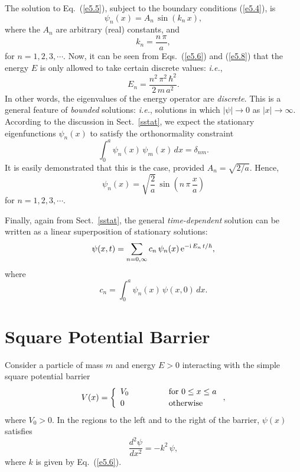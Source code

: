 The solution to Eq.~(\ref{e5.5}), subject to the boundary conditions
(\ref{e5.4}), is
\begin{equation}
\psi_n(x) = A_n\,\sin(k_n\,x),
\end{equation}
where the $A_n$ are arbitrary (real) constants, and
\begin{equation}\label{e5.8}
k_n = \frac{n\,\pi}{a},
\end{equation}
for $n=1,2,3,\cdots$. Now, it can be seen from Eqs.~(\ref{e5.6}) and (\ref{e5.8}) 
that the energy $E$ is only allowed to take certain discrete values:
{\em i.e.},
\begin{equation}\label{eenergy}
E_n = \frac{n^2\,\pi^2\,\hbar^2}{2\,m\,a^2}.
\end{equation}
In other words, the eigenvalues of the energy operator are {\em discrete}. This
is a general feature of {\em bounded}\/ solutions: {\em i.e.}, solutions in which $|\psi|\rightarrow 0$ as $|x|\rightarrow\infty$. According to the discussion in Sect.~\ref{sstat},
we expect the stationary eigenfunctions $\psi_n(x)$ to satisfy
the orthonormality constraint
\begin{equation}
\int_0^a \psi_n(x)\,\psi_m(x)\,dx = \delta_{nm}.
\end{equation}
It is easily demonstrated that this is the case, provided $A_n = \sqrt{2/a}$. 
Hence,
\begin{equation}\label{e5.11}
\psi_n(x) = \sqrt{\frac{2}{a}}\,\sin\left(n\,\pi\,\frac{x}{a}\right)
\end{equation}
for $n=1,2,3,\cdots$. 

Finally, again from Sect.~\ref{sstat}, the general {\em time-dependent}\/ solution can be written as a linear superposition of stationary solutions:
\begin{equation}
\psi(x,t) = \sum_{n=0,\infty} c_n\,\psi_n(x)\,{\rm e}^{-{\rm i}\,E_n\,t/\hbar},
\end{equation}
where
\begin{equation}\label{e5.13}
c_n = \int_0^a\psi_n(x)\,\psi(x,0)\,dx.
\end{equation}

\section{Square Potential Barrier}\label{s5.3}
Consider a particle of mass $m$ and energy $E>0$ interacting with the
simple square potential barrier
\begin{equation}
V(x) = \left\{\begin{array}{lcl}
V_0&\mbox{\hspace{1cm}}&\mbox{for $0\leq x\leq a$}\\[0.5ex]
0&&\mbox{otherwise}
\end{array}
\right.,
\end{equation}
where $V_0>0$. In the regions to the left and to the right of the
barrier, $\psi(x)$ satisfies
\begin{equation}\label{e5.15}
\frac{d^2 \psi}{d x^2} = - k^2\,\psi,
\end{equation}
where $k$ is given by Eq.~(\ref{e5.6}).

